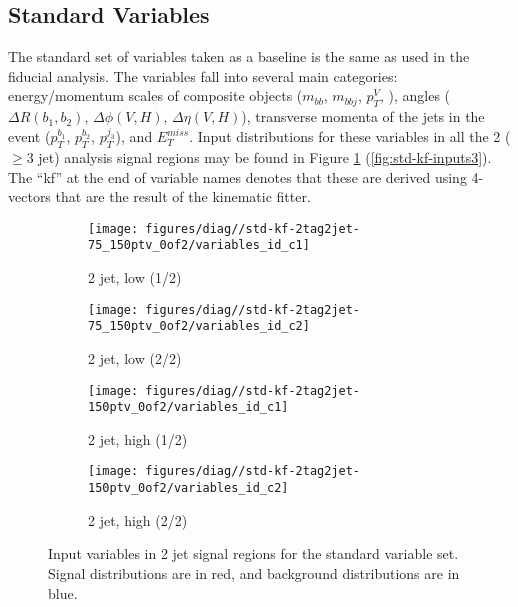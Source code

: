 \subsection{Standard Variables}
The standard set of variables taken as a baseline is the same as used in the fiducial analysis.  The variables fall into several main categories: energy/momentum scales of composite objects ($m_{bb}$, $m_{bbj}$, $p_T^V$, \mll), angles ($\Delta R\left(b_1,b_2\right)$, $\Delta\phi\left(V,H\right)$, $\Delta\eta\left(V,H\right)$), transverse momenta of the jets in the event ($p_T^{b_1}$, $p_T^{b_2}$, $p_T^{j_3}$), and $E_T^{miss}$.  Input distributions for these variables in all the 2 ($\ge3$ jet)  analysis signal regions may be found in Figure \ref{fig:std-kf-inputs2} (\ref{fig:std-kf-inputs3}).  The ``kf'' at the end of variable names denotes that these are derived using 4-vectors that are the result of the kinematic fitter.
\begin{figure}[!htbp]\captionsetup{justification=centering}
  \centering
\begin{subfigure}[t]{0.49\textwidth}\centering\texttt{[image: figures/diag//std-kf-2tag2jet-75\_150ptv\_0of2/variables\_id\_c1]}\caption{2 jet, low \ptv (1/2)}\end{subfigure}
\begin{subfigure}[t]{0.49\textwidth}\centering\texttt{[image: figures/diag//std-kf-2tag2jet-75\_150ptv\_0of2/variables\_id\_c2]}\caption{2 jet, low \ptv (2/2)}\end{subfigure}
\begin{subfigure}[t]{0.49\textwidth}\centering\texttt{[image: figures/diag//std-kf-2tag2jet-150ptv\_0of2/variables\_id\_c1]}\caption{2 jet, high \ptv (1/2)}\end{subfigure}
\begin{subfigure}[t]{0.49\textwidth}\centering\texttt{[image: figures/diag//std-kf-2tag2jet-150ptv\_0of2/variables\_id\_c2]}\caption{2 jet, high \ptv (2/2)}\end{subfigure}
  \caption{Input variables in 2 jet signal regions for the standard variable set.  Signal distributions are in red, and background distributions are in blue.}
  \label{fig:std-kf-inputs2}
\end{figure}
